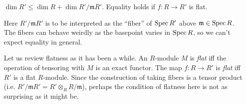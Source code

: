 \begin{theorem} 
$\dim R' \leq \dim R +  \dim R'/\mathfrak{m}R'$. Equality holds if $f: R \to
R'$ is flat.
\end{theorem} 

Here $R'/\mathfrak{m}R'$ is to be interpreted as the ``fiber'' of $\operatorname{Spec} R'$
above $\mathfrak{m} \in \operatorname{Spec} R$. The fibers can behave weirdly as the
basepoint varies in $\operatorname{Spec} R$, so we can't
expect equality in general.

\begin{remark} 
Let us review flatness as it has been a while. An $R$-module $M$ is \emph{flat} iff
the operation of tensoring with $M$ is an exact functor. The map $f: R \to R'$
is \emph{flat} iff $R'$ is a flat $R$-module. Since the construction of taking
fibers is a tensor product (i.e. $R'/\mathfrak{m}R' = R' \otimes_R
R/\mathfrak{m}$), perhaps the condition of flatness here is not as surprising as
it might be.
\end{remark} 

